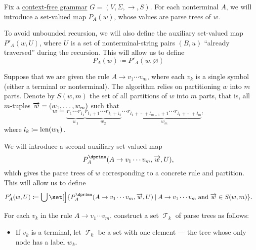 \begin{algorithm}\label{alg:brute_force_parsing}
  Fix a \hyperref[def:chomsky_hierarchy/context_free]{context-free grammar} \( G = (V, \Sigma, \to, S) \). For each nonterminal \( A \), we will introduce a \hyperref[def:function]{set-valued map} \( P_A(w) \), whose values are parse trees of \( w \).

  To avoid unbounded recursion, we will also define the auxiliary set-valued map \( P'_A(w, U) \), where \( U \) is a set of nonterminal-string pairs \( (B, u) \) \enquote{already traversed} during the recursion. This will allow us to define
  \begin{equation*}
    P_A(w)
    \coloneqq
    P'_A(w, \varnothing)
  \end{equation*}

  Suppose that we are given the rule \( A \to v_1 \cdots v_m \), where each \( v_k \) is a single symbol (either a terminal or nonterminal). The algorithm relies on partitioning \( w \) into \( m \) parts. Denote by \( S(w, m) \) the set of all partitions of \( w \) into \( m \) parts, that is, all \( m \)-tuples \( \overrightarrow{w} = (w_1, \ldots, w_m) \) such that
  \begin{equation*}
    w = \underbrace{ r_1 \cdots r_{l_1} }_{w_1} \underbrace{ r_{l_1 + 1} \cdots r_{l_1 + l_2} }_{w_2} \cdots \underbrace{ r_{l_1 + \cdots + l_{m-1} + 1} \cdots r_{l_1 + \cdots + l_m} }_{w_m},
  \end{equation*}
  where \( l_k \coloneqq \operatorname{len}(w_k) \).

  We will introduce a second auxiliary set-valued map
  \begin{equation*}
    P^\dprime_A(A \to v_1 \cdots v_m, \vect w, U),
  \end{equation*}
  which gives the parse trees of \( w \) corresponding to a concrete rule and partition. This will allow us to define
  \begin{equation*}
    P'_A(w, U)
    \coloneqq
    \bigcup\set[\Big]{ P^\dprime_A(A \to v_1 \cdots v_m, \vect w, U) \given A \to v_1 \cdots v_m \T{and} \vect w \in S(w, m) }.
  \end{equation*}

  \begin{thmenum}
     For each \( v_k \) in the rule \( A \to v_1 \cdots v_m \), construct a set \( \mscrT_k \) of parse trees as follows:
    \begin{itemize}
      \item If \( v_k \) is a terminal, let \( \mscrT_k \) be a set with one element --- the tree whose only node has a label \( w_k \).


\end{itemize}
\end{thmenum}
\end{algorithm}
